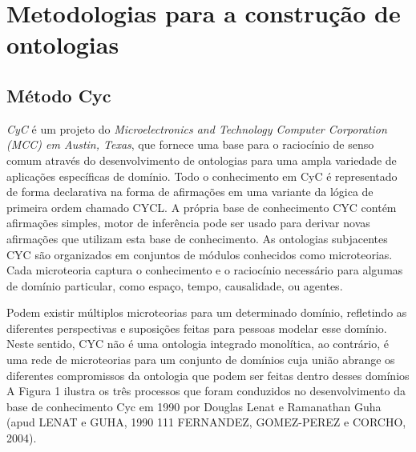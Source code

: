\section{Metodologias para a construção de ontologias}

\subsection{Método Cyc}

\qquad \textit{CyC} é um projeto do \textit{Microelectronics and Technology Computer Corporation (MCC) em Austin, Texas}, que fornece uma base para o raciocínio de senso comum através do desenvolvimento de ontologias para uma ampla variedade de aplicações específicas de domínio. Todo o conhecimento em CyC é representado de forma declarativa na forma de afirmações em uma variante da lógica de primeira ordem chamado CYCL. A própria base de conhecimento CYC contém afirmações simples, motor de inferência pode ser usado para derivar novas afirmações que utilizam esta base de conhecimento.
As ontologias subjacentes CYC são organizados em conjuntos de módulos conhecidos como microteorias. Cada microteoria captura o conhecimento e o raciocínio necessário para algumas de domínio particular, como espaço, tempo, causalidade, ou agentes.

Podem existir múltiplos microteorias para um determinado domínio, refletindo as diferentes perspectivas e suposições feitas para pessoas modelar esse domínio. Neste sentido, CYC não é uma ontologia integrado monolítica, ao contrário, é uma rede de microteorias para um conjunto de domínios cuja união abrange os diferentes compromissos da ontologia que podem ser feitas dentro desses domínios %
	A Figura 1 ilustra os três processos que foram conduzidos no desenvolvimento da
base de conhecimento Cyc em 1990 por Douglas Lenat e Ramanathan Guha (apud LENAT e GUHA, 1990 111 FERNANDEZ, GOMEZ-PEREZ e CORCHO, 2004).

